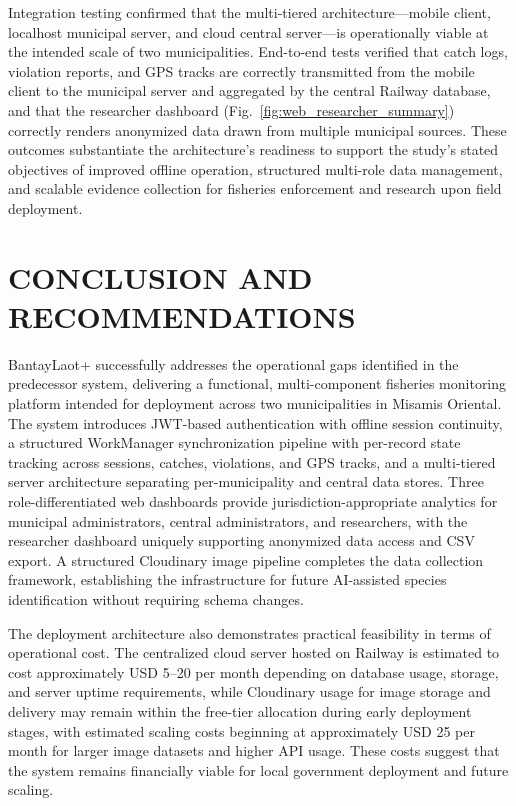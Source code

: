 \documentclass{icsthesis}
\begin{document}
\begin{mainmatter}
Integration testing confirmed that the multi-tiered architecture---mobile client,
localhost municipal server, and cloud central server---is operationally viable at the
intended scale of two municipalities. End-to-end tests verified that catch logs,
violation reports, and GPS tracks are correctly transmitted from the mobile client to the
municipal server and aggregated by the central Railway database, and that the researcher
dashboard (Fig.~\ref{fig:web_researcher_summary}) correctly renders anonymized data
drawn from multiple municipal sources. These outcomes substantiate the architecture's
readiness to support the study's stated objectives of improved offline operation,
structured multi-role data management, and scalable evidence collection for fisheries
enforcement and research upon field deployment.
		
		\section{CONCLUSION AND RECOMMENDATIONS}
			BantayLaot+ successfully addresses the operational gaps identified in the predecessor
system, delivering a functional, multi-component fisheries monitoring platform intended
for deployment across two municipalities in Misamis Oriental. The system introduces
JWT-based authentication with offline session continuity, a structured WorkManager
synchronization pipeline with per-record state tracking across sessions, catches,
violations, and GPS tracks, and a multi-tiered server architecture separating
per-municipality and central data stores. Three role-differentiated web dashboards
provide jurisdiction-appropriate analytics for municipal administrators, central
administrators, and researchers, with the researcher dashboard uniquely supporting
anonymized data access and CSV export. A structured Cloudinary image pipeline completes the data collection framework,
establishing the infrastructure for future AI-assisted species identification without
requiring schema changes.

The deployment architecture also demonstrates practical feasibility in terms of
operational cost. The centralized cloud server hosted on Railway is estimated to cost
approximately USD 5--20 per month depending on database usage, storage, and server
uptime requirements, while Cloudinary usage for image storage and delivery may remain
within the free-tier allocation during early deployment stages, with estimated scaling
costs beginning at approximately USD 25 per month for larger image datasets and higher
API usage. These costs suggest that the system remains financially viable for local
government deployment and future scaling.


\end{mainmatter}
\end{document}
